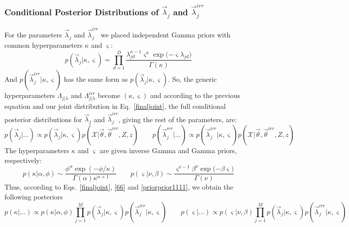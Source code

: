 \documentclass[journal,10pt]{elsart}
\begin{document}
\subsubsection{Conditional Posterior Distributions of $\vec{\lambda}_j$ and $\vec{\lambda}_j^{irr}$} For the parameters $\vec{\lambda}_j$ and $\vec{\lambda}_j^{irr}$ we placed independent Gamma priors with common hyperparameters $\kappa$ and $\varsigma$:
\begin{equation}\label{66}
p(\vec{\lambda}_j|\kappa,\varsigma)=\prod_{d=1}^D\frac{\lambda_{jd}^{\kappa-1}\varsigma^{\kappa}\exp\big({-\varsigma
\lambda_{jd}}\big)}{\Gamma(\kappa)}
\end{equation}
And $p(\vec{\lambda}_j^{irr}|\kappa,\varsigma)$ has the same form as $p(\vec{\lambda}_j|\kappa,\varsigma)$. So, the generic hyperparameters $\Lambda_{j|\lambda}$ and $\Lambda_{j|\lambda}^{irr}$ become $(\kappa,\varsigma)$ and according to the previous equation and our joint distribution in Eq.~\ref{finaljoint}, the full conditional posterior distributions for $\vec{\lambda}_j$ and $\vec{\lambda}_j^{irr}$, giving the rest of the parameters, are:
\begin{equation}\label{lambdaposterior}
p(\vec{\lambda}_j|\ldots) \propto p(\vec{\lambda}_j|\kappa,\varsigma)p(\mathcal{X}|\vec{\theta},\vec{\theta}^{irr},Z,z) \qquad
p(\vec{\lambda}_j^{irr}|\ldots) \propto p(\vec{\lambda}_j^{irr}|\kappa,\varsigma)p(\mathcal{X}|\vec{\theta},\vec{\theta}^{irr},Z,z)
\end{equation}
The hyperparameters $\kappa$ and $\varsigma$ are given inverse Gamma and Gamma priors, respectively:
\begin{equation}\label{priorprior1111}
p(\kappa|\alpha,\phi) \sim \frac{\phi^\alpha\exp(-\phi/
\kappa)}{\Gamma(\alpha)\kappa^{\alpha+1}} \qquad
p(\varsigma|\nu,\beta) \sim \frac{\varsigma^{\nu-1}\beta^{\nu}\exp\big({-\beta
\varsigma}\big)}{\Gamma(\nu)}
\end{equation}
Thus, according to Eqs.~\ref{finaljoint}, \ref{66} and \ref{priorprior1111}, we obtain the following posteriors
\begin{equation}\label{posteriors1111}
p(\kappa|\ldots) \propto p(\kappa|\alpha,\phi) \prod_{j=1}^M p(\vec{\lambda}_j|\kappa,\varsigma)p(\vec{\lambda}_j^{irr}|\kappa,\varsigma) \qquad p(\varsigma|\ldots) \propto p(\varsigma|\nu,\beta)\prod_{j=1}^M p(\vec{\lambda}_j|\kappa,\varsigma)p(\vec{\lambda}_j^{irr}|\kappa,\varsigma)
\end{equation}
\end{document}
